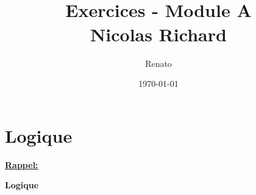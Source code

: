 \documentclass{report}
\title{\Large{\bsc{MATH-F-112 - Math\'{e}matiques}}\\
  Exercices - Module A\\
  Nicolas Richard
  }
\author{Renato \bsc{Costa Ribeiro}}
\date{\today}
\begin{document}
\maketitle
\tableofcontents

\newpage


\chapter{Logique}
\begin{flushleft} \begin{large}\textbf{\underline{Rappel:}}\end{large}\end{flushleft}

\begin{flushleft} \begin{large}\textbf{Logique}\end{large}\end{flushleft}
\end{document}

